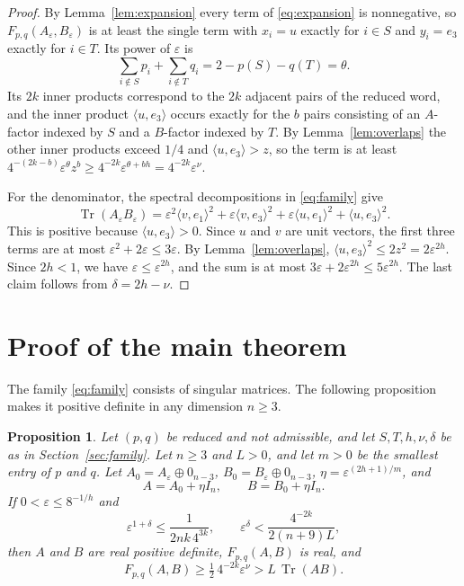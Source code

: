 \documentclass{amsart}
\newtheorem{proposition}[theorem]{Proposition}
\theoremstyle{definition}
\theoremstyle{remark}
\numberwithin{equation}{section}
\newcommand{\Tr}{\operatorname{Tr}}
\begin{document}
\begin{proof}
By Lemma~\ref{lem:expansion} every term of \eqref{eq:expansion} is nonnegative, so $F_{p,q}(A_\varepsilon,B_\varepsilon)$ is at least the single term with $x_i=u$ exactly for $i\in S$ and $y_i=e_3$ exactly for $i\in T$. Its power of $\varepsilon$ is
\[
\sum_{i\notin S}p_i+\sum_{i\notin T}q_i=2-p(S)-q(T)=\theta .
\]
Its $2k$ inner products correspond to the $2k$ adjacent pairs of the reduced word, and the inner product $\langle u,e_3\rangle$ occurs exactly for the $b$ pairs consisting of an $A$-factor indexed by $S$ and a $B$-factor indexed by $T$. By Lemma~\ref{lem:overlaps} the other inner products exceed $1/4$ and $\langle u,e_3\rangle>z$, so the term is at least $4^{-(2k-b)}\varepsilon^{\theta}z^{b}\ge 4^{-2k}\varepsilon^{\theta+bh}=4^{-2k}\varepsilon^{\nu}$.

For the denominator, the spectral decompositions in \eqref{eq:family} give
\[
\Tr(A_\varepsilon B_\varepsilon)=\varepsilon^2\langle v,e_1\rangle^2+\varepsilon\langle v,e_3\rangle^2+\varepsilon\langle u,e_1\rangle^2+\langle u,e_3\rangle^2 .
\]
This is positive because $\langle u,e_3\rangle>0$. Since $u$ and $v$ are unit vectors, the first three terms are at most $\varepsilon^2+2\varepsilon\le 3\varepsilon$. By Lemma~\ref{lem:overlaps}, $\langle u,e_3\rangle^2\le 2z^2=2\varepsilon^{2h}$. Since $2h<1$, we have $\varepsilon\le\varepsilon^{2h}$, and the sum is at most $3\varepsilon+2\varepsilon^{2h}\le 5\varepsilon^{2h}$. The last claim follows from $\delta=2h-\nu$.
\end{proof}

\section{Proof of the main theorem}\label{sec:proof}

The family \eqref{eq:family} consists of singular matrices. The following proposition makes it positive definite in any dimension $n\ge 3$.

\begin{proposition}\label{prop:pd}
Let $(p,q)$ be reduced and not admissible, and let $S,T,h,\nu,\delta$ be as in Section~\ref{sec:family}. Let $n\ge 3$ and $L>0$, and let $m>0$ be the smallest entry of $p$ and $q$. Let $A_0=A_\varepsilon\oplus 0_{n-3}$, $B_0=B_\varepsilon\oplus 0_{n-3}$, $\eta=\varepsilon^{(2h+1)/m}$, and
\[
A=A_0+\eta I_n,\qquad B=B_0+\eta I_n .
\]
If $0<\varepsilon\le 8^{-1/h}$ and
\begin{equation}\label{eq:epsilon}
\varepsilon^{1+\delta}\le\frac{1}{2nk\,4^{3k}},\qquad
\varepsilon^{\delta}<\frac{4^{-2k}}{2(n+9)L},
\end{equation}
then $A$ and $B$ are real positive definite, $F_{p,q}(A,B)$ is real, and
\[
F_{p,q}(A,B)\ge\tfrac12\,4^{-2k}\varepsilon^{\nu}>L\,\Tr(AB).
\]
\end{proposition}
\end{document}
